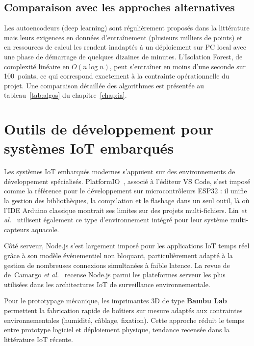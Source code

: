 \documentclass[12pt,a4paper]{report}
\begin{document}
\subsection{Comparaison avec les approches alternatives}

Les autoencodeurs (deep learning) sont régulièrement proposés dans la littérature
\cite{elshafeiy2023anomaly} mais leurs exigences en données d'entraînement
(plusieurs milliers de points) et en ressources de calcul les rendent inadaptés
à un déploiement sur PC local avec une phase de démarrage de quelques dizaines de
minutes. L'Isolation Forest, de complexité linéaire en $O(n \log n)$, peut
s'entraîner en moins d'une seconde sur 100~points, ce qui correspond exactement
à la contrainte opérationnelle du projet. Une comparaison détaillée des algorithmes
est présentée au tableau~\ref{tab:algos} du chapitre~\ref{chap:ia}.

\section{Outils de développement pour systèmes IoT embarqués}

Les systèmes IoT embarqués modernes s'appuient sur des environnements de
développement spécialisés. PlatformIO~\cite{platformio}, associé à l'éditeur
VS Code, s'est imposé comme la référence pour le développement sur
microcontrôleurs ESP32 : il unifie la gestion des bibliothèques, la compilation
et le flashage dans un seul outil, là où l'IDE Arduino classique montrait ses
limites sur des projets multi-fichiers. Lin \textit{et al.}~\cite{lin2021aqua}
utilisent également ce type d'environnement intégré pour leur système
multi-capteurs aquacole.

Côté serveur, Node.js s'est largement imposé pour les applications IoT temps
réel grâce à son modèle événementiel non bloquant, particulièrement adapté à la
gestion de nombreuses connexions simultanées à faible latence. La revue de
de~Camargo \textit{et al.}~\cite{camargo2023lowcost} recense Node.js parmi les
plateformes serveur les plus utilisées dans les architectures IoT de surveillance
environnementale.

Pour le prototypage mécanique, les imprimantes 3D de type \textbf{Bambu Lab}
permettent la fabrication rapide de boîtiers sur mesure adaptés aux contraintes
environnementales (humidité, câblage, fixation). Cette approche réduit le temps
entre prototype logiciel et déploiement physique, tendance recensée dans la
littérature IoT récente.
\end{document}
